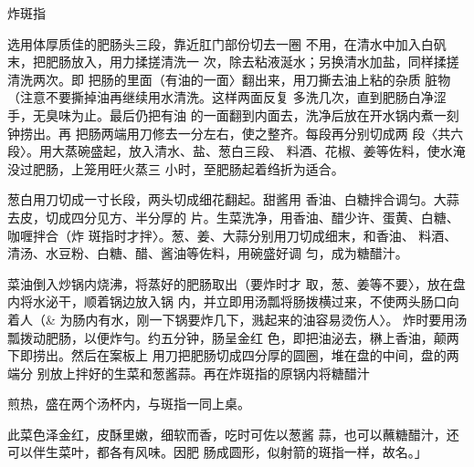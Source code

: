 \begin{recipe}{炸斑指}

\ingredients






\cooking

\step 选用体厚质佳的肥肠头三段，靠近肛门部份切去一圈 不用，在清水中加入白矾末，把肥肠放入，用力揉搓清洗一 次，除去粘液涎水；另换清水加盐，同样揉搓清洗两次。即 把肠的里面（有油的一面〉翻出来，用刀撕去油上粘的杂质 脏物（注意不要撕掉油再继续用水清洗。这样两面反复 多洗几次，直到肥肠白净涩手，无臭味为止。最后仍把有油 的一面翻到内面去，洗净后放在开水锅内煮一刻钟捞出。再 把肠两端用刀修去一分左右，使之整齐。每段再分别切成两 段〈共六段〉。用大蒸碗盛起，放入清水、盐、葱白三段、 料酒、花椒、姜等佐料，使水淹没过肥肠，上笼用旺火蒸三 小时，至肥肠起着绉折为适合。

\step 葱白用刀切成一寸长段，两头切成细花翻起。甜酱用 香油、白糖拌合调匀。大蒜去皮，切成四分见方、半分厚的 片。生菜洗净，用香油、醋少许、蛋黄、白糖、咖喱拌合（炸 斑指时才拌〉。葱、姜、大蒜分别用刀切成细末，和香油、 料酒、清汤、水豆粉、白糖、醋、酱油等佐料，用碗盛好调 匀，成为糖醋汁。

\step 菜油倒入炒锅内烧沸，将蒸好的肥肠取出（要炸时才 取，葱、姜等不要〉，放在盘内将水泌干，顺着锅边放入锅 内，并立即用汤瓢将肠拨横过来，不使两头肠口向着人（& 为肠内有水，刚一下锅要炸几下，溅起来的油容易烫伤人〉。 炸时要用汤瓢拨动肥肠，以便炸勻。约五分钟，肠呈金红 色，即把油泌去，楙上香油，颠两下即捞出。然后在案板上 用刀把肥肠切成四分厚的圆圈，堆在盘的中间，盘的两端分 别放上拌好的生菜和葱酱蒜。再在炸斑指的原锅内将糖醋汁

煎热，盛在两个汤杯内，与斑指一同上桌。

\notes

此菜色泽金红，皮酥里嫩，细软而香，吃时可佐以葱酱 蒜，也可以蘸糖醋汁，还可以伴生菜叶，都各有风味。因肥 肠成圆形，似射箭的斑指一样，故名。」

\end{recipe}

